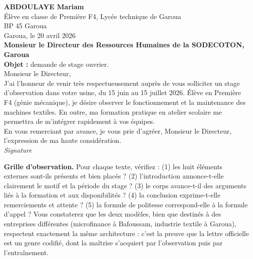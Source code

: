 \documentclass[11pt]{article}
\newcommand{\cle}[1]{{\popxbold\color{popdark}#1}}
\begin{document}
\begin{exemplebox}
\textbf{ABDOULAYE Mariam}\\
Élève en classe de Première F4, Lycée technique de Garoua\\
BP 45 Garoua\\[4pt]
\hfill Garoua, le 20 avril 2026\\[4pt]
\hfill \textbf{Monsieur le Directeur des Ressources Humaines de la SODECOTON, Garoua}\\[4pt]
\textbf{Objet :} demande de stage ouvrier.\\[4pt]
Monsieur le Directeur,\\[4pt]
\hspace{0.6cm} J'ai l'honneur de venir très respectueusement auprès de vous solliciter un stage d'observation dans votre usine, du 15 juin au 15 juillet 2026. Élève en Première F4 (génie mécanique), je désire observer le fonctionnement et la maintenance des machines textiles. En outre, ma formation pratique en atelier scolaire me permettra de m'intégrer rapidement à vos équipes.\\[4pt]
\hspace{0.6cm} En vous remerciant par avance, je vous prie d'agréer, Monsieur le Directeur, l'expression de ma haute considération.\\[6pt]
\hfill \emph{Signature}
\end{exemplebox}

\textbf{Grille d'observation.} Pour chaque texte, vérifiez : (1) les huit éléments externes sont-ils présents et bien placés ? (2) l'introduction annonce-t-elle clairement le motif et la période du stage ? (3) le corps avance-t-il des arguments liés à la formation et aux disponibilités ? (4) la conclusion exprime-t-elle remerciements et attente ? (5) la formule de politesse correspond-elle à la formule d'appel ? Vous constaterez que les deux modèles, bien que destinés à des entreprises différentes (microfinance à Bafoussam, industrie textile à Garoua), respectent exactement la même architecture : c'est la preuve que la lettre officielle est un genre \cle{codifié}, dont la maîtrise s'acquiert par l'observation puis par l'entraînement.
\end{document}
